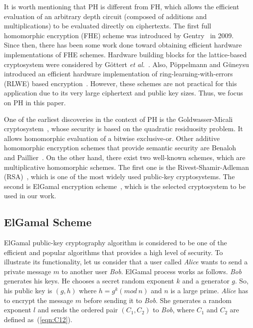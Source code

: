 \documentclass[conference]{IEEEtran}
\begin{document}
It is worth mentioning that PH is different from FH, which allows the efficient evaluation of an arbitrary depth circuit (composed of additions and multiplications) to be evaluated directly on ciphertexts. The first full homomorphic encryption (FHE) scheme was introduced by Gentry{\color{blue}~\cite{phD:Gentry}} in 2009. Since then, there has been some work done toward obtaining efficient hardware implementations of FHE schemes. Hardware building blocks for the lattice-based cryptosystem were considered by G\"{o}ttert \textit{et al.}{\color{blue}~\cite{Gottert:2012}}. Also, P\"{o}ppelmann and G\"{u}neysu introduced an efficient hardware implementation of ring-learning-with-errors (RLWE) based encryption{\color{blue}~\cite{Thomas12}}. However, these schemes are not practical for this application due to its very large ciphertext and public key sizes. Thus, we focus on PH in this paper. 

One of the earliest discoveries in the context of PH is the Goldwasser-Micali cryptosystem{\color{blue}~\cite{jour:Goldwasser84}}, whose security is based on the quadratic residuosity problem. It allows homomorphic evaluation of a bitwise exclusive-or. Other additive homomorphic encryption schemes that provide semantic security are Benaloh{\color{blue}~\cite{jour:Clarkson94}} and Paillier{\color{blue}~\cite{Paillier99}}. On the other hand, there exist two well-known schemes, which are multiplicative homomorphic schemes. The first one is the Rivest-Shamir-Adleman (RSA){\color{blue}~\cite{conf:RSA78}}, which is one of the most widely used public-key cryptosystems. The second is ElGamal encryption scheme{\color{blue}~\cite{ElGamal85}}, which is the selected cryptosystem to be used in our work. 




\subsection{ElGamal Scheme} \label{sub:ElGamal}
ElGamal public-key cryptography algorithm is considered to be one of the efficient and popular algorithms that provides a high level of security. To illustrate its functionality, let us consider that a user called \textit{Alice} wants to send a private message $m$ to another user \textit{Bob}. ElGamal process works as follows. \textit{Bob} generates his keys. He chooses a secret random exponent $k$ and a generator $g$. So, his public key is $(g,h)$ where ${h = g^k (mod \: n)}$ and $n$ is a large prime. \textit{Alice} has to encrypt the message $m$ before sending it to \textit{Bob}. She generates a random exponent $l$ and sends the ordered pair $(C_1,C_2)$ to \textit{Bob}, where $C_1$ and $C_2$ are defined as~(\ref{eqn:C12}).    
\end{document}
